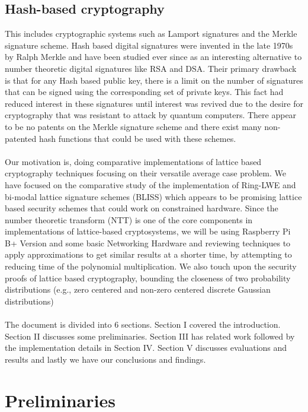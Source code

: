 \documentclass[conference]{IEEEtran}
\begin{document}
\subsection{Hash-based cryptography}
This includes cryptographic systems such as Lamport signatures and the Merkle signature scheme. Hash based digital signatures were invented in the late 1970s by Ralph Merkle and have been studied ever since as an interesting alternative to number theoretic digital signatures like RSA and DSA. Their primary drawback is that for any Hash based public key, there is a limit on the number of signatures that can be signed using the corresponding set of private keys. This fact had reduced interest in these signatures until interest was revived due to the desire for cryptography that was resistant to attack by quantum computers. There appear to be no patents on the Merkle signature scheme and there exist many non-patented hash functions that could be used with these schemes.\\
\\

Our motivation is, doing comparative implementations of lattice based cryptography techniques focusing on their versatile average case problem. 
We have focused on the comparative study of the implementation of Ring-LWE and bi-modal lattice signature schemes (BLISS) which appears to be promising lattice based security schemes that could work on constrained hardware. Since the number theoretic transform (NTT) is one of the core components in implementations of lattice-based cryptosystems, we will be using Raspberry Pi B+ Version and some basic Networking Hardware and reviewing techniques to apply approximations to get similar results at a shorter time, by attempting to reducing time of the polynomial multiplication. We also touch upon the security proofs of lattice based cryptography, bounding the closeness of two probability distributions (e.g., zero centered and non-zero centered discrete Gaussian distributions)\\
\\
The document is divided into 6 sections. Section I covered the introduction. Section II discusses some preliminaries. Section III has related work followed by the implementation details in Section IV. Section V discusses evaluations and results and lastly we have our conclusions and findings.


\section{Preliminaries}
\end{document}
